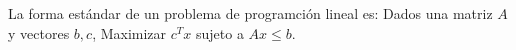 \documentclass{article}
\begin{document}
La forma estándar de un problema de programción lineal es:
Dados una matriz $A$ y vectores $b,c$, Maximizar $c^Tx$ sujeto a
$Ax\leq b$.  
\end{document}
